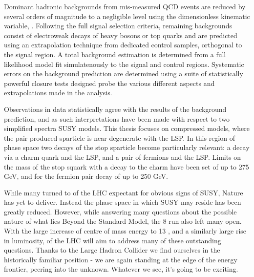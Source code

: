 Dominant hadronic backgrounds from mis-measured QCD events are reduced by
several orders of magnitude to a negligible level using the dimensionless
kinematic variable, \alphat. Following the full signal selection criteria,
remaining backgrounds consist of electroweak decays of
heavy bosons or top quarks and are predicted using an extrapolation technique
from dedicated control samples,
orthogonal to the signal region. A total background estimation is determined
from a full likelihood model fit simulatenously to the signal and control
regions. Systematic errors on the background prediction are determined using a
suite of statistically powerful closure tests designed probe the various
different aspects and extrapolations made in the analysis.

Observations in data statistically agree with the results of the background
prediction, and as such interpretations have been made with respect to two
simplified spectra SUSY models. This thesis focuses on compressed models, where
the pair-produced sparticle is near-degenerate with the LSP. In this region of
phase space two decays of the stop sparticle become particularly relevant: a
decay via a charm quark and the LSP, and a pair of fermions and the LSP. Limits
on the mass of the stop squark with a decay to the charm have been set of up to
275 GeV, and for the fermion pair decay of up to 250 GeV.

While many turned to \runone of the LHC expectant for obvious signs of SUSY,
Nature has yet to deliver. Instead the phase space in which SUSY may
reside has been greatly reduced.
However, while answering many questions about the possible
nature of what lies Beyond the Standard Model, the 8
\tev run also left many open. With the
large increase of centre of mass energy to 13 \tev, and a similarly large
rise in luminosity, \runtwo of the LHC will aim to address many of these
outstanding questions. Thanks to the Large Hadron Collider we find ourselves in
the historically familiar position - we are again standing at the edge of
the energy frontier, peering into the unknown. Whatever we see, it's going to be
exciting.

